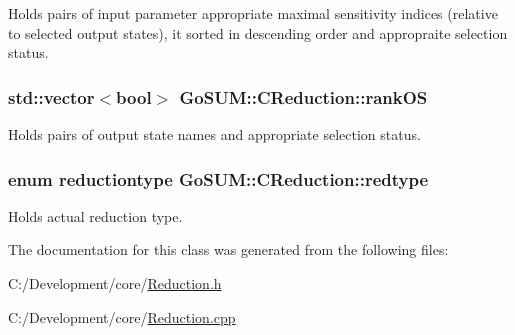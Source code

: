 Holds pairs of input parameter appropriate maximal sensitivity indices (relative to selected output states), it sorted in descending order and appropraite selection status. 

\hypertarget{class_go_s_u_m_1_1_c_reduction_a2e15526f1046a79bf00404521806d36d}{
\subsubsection[{rank\-O\-S}]{\setlength{\rightskip}{0pt plus 5cm}std\-::vector$<$bool$>$ Go\-S\-U\-M\-::\-C\-Reduction\-::rank\-O\-S\hspace{0.3cm}{\ttfamily [private]}}}\label{class_go_s_u_m_1_1_c_reduction_a2e15526f1046a79bf00404521806d36d}


Holds pairs of output state names and appropriate selection status. 

\hypertarget{class_go_s_u_m_1_1_c_reduction_aeaebab0853ed76b3fdc41cde083c63d9}{
\subsubsection[{redtype}]{\setlength{\rightskip}{0pt plus 5cm}enum {\bf reductiontype} Go\-S\-U\-M\-::\-C\-Reduction\-::redtype\hspace{0.3cm}{\ttfamily [static]}}}\label{class_go_s_u_m_1_1_c_reduction_aeaebab0853ed76b3fdc41cde083c63d9}


Holds actual reduction type. 



The documentation for this class was generated from the following files\-:\begin{DoxyCompactItemize}
\item 
C\-:/\-Development/core/\hyperlink{_reduction_8h}{Reduction.\-h}\item 
C\-:/\-Development/core/\hyperlink{_reduction_8cpp}{Reduction.\-cpp}\end{DoxyCompactItemize}
